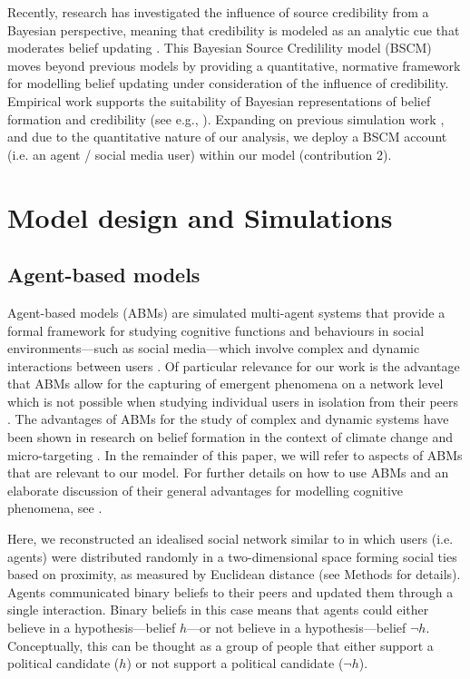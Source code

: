 \documentclass[fleqn,10pt]{wlscirep}
\begin{document}
Recently, research has investigated the influence of source credibility from a Bayesian perspective, meaning that credibility is modeled as an analytic cue that moderates belief updating \cite{bovens2003bayesian, hahn2009argument, harris2009bayesian, oaksford2007bayesian}. This Bayesian Source Credilility model (BSCM) moves beyond previous models by providing a quantitative, normative framework for modelling belief updating under consideration of the influence of credibility. Empirical work supports the suitability of Bayesian representations of belief formation and credibility (see e.g., \cite{harris2016appeal}). Expanding on previous simulation work \cite{madsen2017growing, madsen2018large}, and due to the quantitative nature of our analysis, we deploy a BSCM account (i.e. an agent / social media user) within our model (contribution 2). 


\section*{Model design and Simulations}

\subsection*{Agent-based models}
Agent-based models (ABMs) are simulated multi-agent systems that provide a formal framework for studying cognitive functions and behaviours in social environments---such as social media---which involve complex and dynamic interactions between users \cite{wilensky2015introduction}. Of particular relevance for our work is the advantage that ABMs allow for the capturing of emergent phenomena on a network level which is not possible when studying individual users in isolation from their peers  \cite{madsen2019analytic}. The advantages of ABMs for the study of complex and dynamic systems have been shown in research on belief formation in the context of climate change \cite{lewandowsky2019influence} and micro-targeting \cite{madsen2018method}. In the remainder of this paper, we will refer to aspects of ABMs that are relevant to our model. For further details on how to use ABMs and an elaborate discussion of their general advantages for modelling cognitive phenomena, see \cite{macal2005tutorial, madsen2019analytic}.

Here, we reconstructed an idealised social network similar to \cite{pilditch2017opinion, madsen2018large} in which users (i.e. agents) were distributed randomly in a two-dimensional space forming social ties based on proximity, as measured by Euclidean distance (see Methods for details). Agents communicated binary beliefs to their peers and updated them through a single interaction. Binary beliefs in this case means that agents could either believe in a hypothesis---belief \(h\)---or not believe in a hypothesis---belief \(\neg h\). Conceptually, this can be thought as a group of people that either support a political candidate (\(h\)) or not support a political candidate (\(\neg h\)). 
\end{document}
